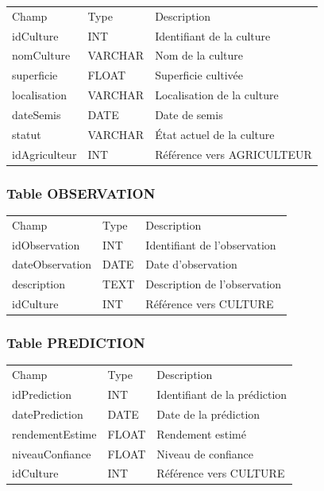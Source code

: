 \begin{longtable}[]{@{}lll@{}}
\toprule
\endhead
Champ & Type & Description \\
idCulture & INT & Identifiant de la culture \\
nomCulture & VARCHAR & Nom de la culture \\
superficie & FLOAT & Superficie cultivée \\
localisation & VARCHAR & Localisation de la culture \\
dateSemis & DATE & Date de semis \\
statut & VARCHAR & État actuel de la culture \\
idAgriculteur & INT & Référence vers AGRICULTEUR \\
\bottomrule
\end{longtable}

\hypertarget{table-observation}{%
\subsubsection{Table OBSERVATION}\label{table-observation}}

\begin{longtable}[]{@{}lll@{}}
\toprule
\endhead
Champ & Type & Description \\
idObservation & INT & Identifiant de l'observation \\
dateObservation & DATE & Date d'observation \\
description & TEXT & Description de l'observation \\
idCulture & INT & Référence vers CULTURE \\
\bottomrule
\end{longtable}

\hypertarget{table-prediction}{%
\subsubsection{Table PREDICTION}\label{table-prediction}}

\begin{longtable}[]{@{}lll@{}}
\toprule
\endhead
Champ & Type & Description \\
idPrediction & INT & Identifiant de la prédiction \\
datePrediction & DATE & Date de la prédiction \\
rendementEstime & FLOAT & Rendement estimé \\
niveauConfiance & FLOAT & Niveau de confiance \\
idCulture & INT & Référence vers CULTURE \\
\bottomrule
\end{longtable}

